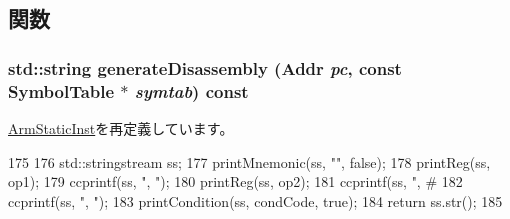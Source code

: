 \subsection{関数}
\hypertarget{classArmISA_1_1DataXCondCompRegOp_a95d323a22a5f07e14d6b4c9385a91896}{
\subsubsection[{generateDisassembly}]{\setlength{\rightskip}{0pt plus 5cm}std::string generateDisassembly ({\bf Addr} {\em pc}, \/  const SymbolTable $\ast$ {\em symtab}) const}}
\label{classArmISA_1_1DataXCondCompRegOp_a95d323a22a5f07e14d6b4c9385a91896}


\hyperlink{classArmISA_1_1ArmStaticInst_a95d323a22a5f07e14d6b4c9385a91896}{ArmStaticInst}を再定義しています。


\begin{DoxyCode}
175 {
176     std::stringstream ss;
177     printMnemonic(ss, "", false);
178     printReg(ss, op1);
179     ccprintf(ss, ", ");
180     printReg(ss, op2);
181     ccprintf(ss, ", #%
182     ccprintf(ss, ", ");
183     printCondition(ss, condCode, true);
184     return ss.str();
185 }
\end{DoxyCode}


